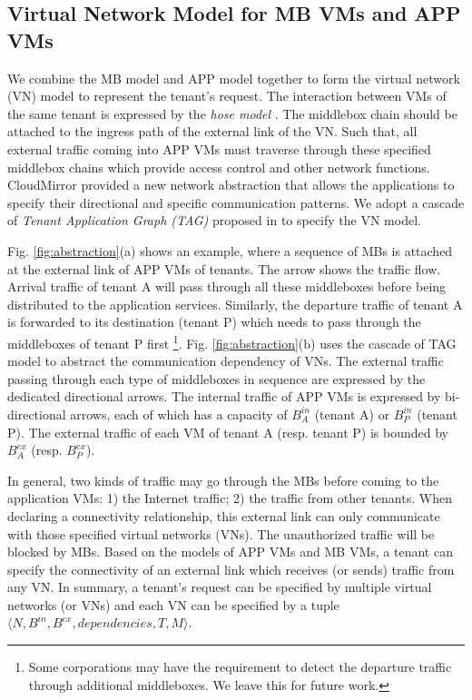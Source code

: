 \documentclass[review]{elsarticle}
\begin{document}
\subsection{Virtual Network Model for MB VMs and APP VMs} 
We combine the MB model and APP model together to form the virtual network (VN) model to represent the tenant's request. The interaction between VMs of the same tenant is expressed by the \emph{hose model} \cite{hose_model}. The middlebox chain should be attached to the ingress path of the external link of the VN. Such that, all external traffic coming into APP VMs must traverse through these specified middlebox chains which provide access control and other network functions. CloudMirror \cite{cloudmirror} provided a new network abstraction that allows the applications to specify their directional and specific communication patterns. We adopt a cascade of \emph{Tenant Application Graph (TAG)} proposed in \cite{cloudmirror} to specify the VN model. 


Fig. \ref{fig:abstraction}(a) shows an example, where a sequence of MBs is attached at the external link of APP VMs of tenants. The arrow shows the traffic flow. Arrival traffic of tenant A will pass through all these middleboxes before being distributed to the application services. Similarly,  the departure traffic of tenant A is forwarded to its destination (tenant P) which needs to pass through the middleboxes of tenant P first \footnote{Some corporations may have the requirement to detect the departure traffic through additional middleboxes. We leave this for future work. }.  Fig. \ref{fig:abstraction}(b) uses the cascade of TAG model to abstract the communication dependency of VNs. The external traffic passing through each type of middleboxes in sequence are expressed by the dedicated directional arrows. The internal traffic of APP VMs is expressed by bi-directional arrows, each of which has a capacity of $B_{A}^{in}$ (tenant A) or $B_{P}^{in}$ (tenant P). The external traffic of each VM of tenant A (resp. tenant P) is bounded by $B_{A}^{ex}$ (resp. $B_{P}^{ex}$). 


In general, two kinds of traffic may go through the MBs before coming to the application VMs: 1) the Internet traffic; 2) the traffic from other tenants. When declaring a connectivity relationship, this external link can only communicate with those specified virtual networks (VNs). The unauthorized traffic will be blocked by MBs. Based on the models of APP VMs and MB VMs, a tenant can specify the connectivity of an external link which receives (or sends) traffic from any VN. In summary, a tenant's request can be specified by multiple virtual networks (or VNs) and each VN can be specified by a tuple $\langle N, B^{in}, B^{ex}, dependencies, T, M\rangle$. 
\end{document}
